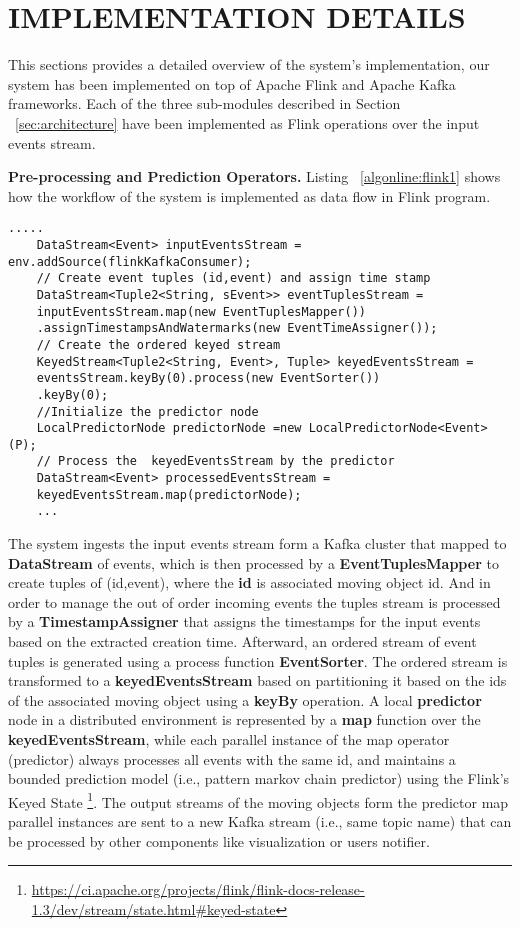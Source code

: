 

\section{IMPLEMENTATION DETAILS}
\label{sec:impl}
This sections provides a detailed overview of the system's implementation, our system has been implemented on top of Apache Flink and Apache Kafka frameworks. Each of the three sub-modules described in Section  ~\ref{sec:architecture} have been implemented as Flink operations over the input events stream. 

\textbf{Pre-processing and Prediction Operators.} Listing ~\ref{algonline:flink1} shows how the workflow of the system is implemented as data flow in Flink program.


	\begin{lstlisting}[caption={Flink pipeline for local predictors workflow},label={algonline:flink1},frame=single]
	.....
	DataStream<Event> inputEventsStream = env.addSource(flinkKafkaConsumer);	
	// Create event tuples (id,event) and assign time stamp 
	DataStream<Tuple2<String, sEvent>> eventTuplesStream =
	inputEventsStream.map(new EventTuplesMapper())
	.assignTimestampsAndWatermarks(new EventTimeAssigner());	
	// Create the ordered keyed stream 
	KeyedStream<Tuple2<String, Event>, Tuple> keyedEventsStream =
	eventsStream.keyBy(0).process(new EventSorter())
	.keyBy(0);	
	//Initialize the predictor node 
	LocalPredictorNode predictorNode =new LocalPredictorNode<Event>(P);
	// Process the  keyedEventsStream by the predictor 
	DataStream<Event> processedEventsStream =
	keyedEventsStream.map(predictorNode);
	...
	\end{lstlisting}
	
The system ingests the input events stream form a Kafka cluster that mapped to \textbf{DataStream} of events, which is then processed by a \textbf{EventTuplesMapper} to create tuples of (id,event), where the  \textbf{id} is associated moving object id. And in order to manage the out of order incoming events the tuples stream is processed by a \textbf{TimestampAssigner} that assigns the timestamps for the input events  based on the extracted creation time. Afterward,  an ordered stream of event tuples is generated using a process function \textbf{EventSorter}. The ordered stream is transformed to a \textbf{keyedEventsStream} based on partitioning it based on the ids of the associated moving object using a \textbf{keyBy} operation. A local \textbf{predictor} node in a distributed environment is represented by a \textbf{map} function over the \textbf{keyedEventsStream}, while each parallel instance of the map operator (predictor) always processes all events with the same id, and maintains a bounded prediction model (i.e., pattern markov chain predictor) using the Flink's Keyed State \footnote{\url{https://ci.apache.org/projects/flink/flink-docs-release-1.3/dev/stream/state.html\#keyed-state}}.   The output streams of the moving objects form the predictor map parallel instances are sent to a new Kafka stream (i.e., same topic name) that can be processed by other components like visualization or users notifier.



